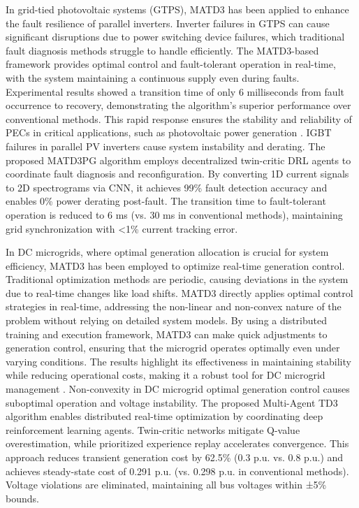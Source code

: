 In grid-tied photovoltaic systems (GTPS), MATD3 has been applied to enhance the fault resilience of parallel inverters. Inverter failures in GTPS can cause significant disruptions due to power switching device failures, which traditional fault diagnosis methods struggle to handle efficiently. The MATD3-based framework provides optimal control and fault-tolerant operation in real-time, with the system maintaining a continuous supply even during faults. Experimental results showed a transition time of only 6 milliseconds from fault occurrence to recovery, demonstrating the algorithm’s superior performance over conventional methods. This rapid response ensures the stability and reliability of PECs in critical applications, such as photovoltaic power generation \cite{malik2024fault}. IGBT failures in parallel PV inverters cause system instability and derating. The proposed MATD3PG algorithm employs decentralized twin-critic DRL agents to coordinate fault diagnosis and reconfiguration. By converting 1D current signals to 2D spectrograms via CNN, it achieves 99\% fault detection accuracy and enables 0\% power derating post-fault. The transition time to fault-tolerant operation is reduced to 6 ms (vs. 30 ms in conventional methods), maintaining grid synchronization with <1\% current tracking error.

In DC microgrids, where optimal generation allocation is crucial for system efficiency, MATD3 has been employed to optimize real-time generation control. Traditional optimization methods are periodic, causing deviations in the system due to real-time changes like load shifts. MATD3 directly applies optimal control strategies in real-time, addressing the non-linear and non-convex nature of the problem without relying on detailed system models. By using a distributed training and execution framework, MATD3 can make quick adjustments to generation control, ensuring that the microgrid operates optimally even under varying conditions. The results highlight its effectiveness in maintaining stability while reducing operational costs, making it a robust tool for DC microgrid management \cite{fan2023multi}. Non-convexity in DC microgrid optimal generation control causes suboptimal operation and voltage instability. The proposed Multi-Agent TD3 algorithm enables distributed real-time optimization by coordinating deep reinforcement learning agents. Twin-critic networks mitigate Q-value overestimation, while prioritized experience replay accelerates convergence. This approach reduces transient generation cost by 62.5\% (0.3 p.u. vs. 0.8 p.u.) and achieves steady-state cost of 0.291 p.u. (vs. 0.298 p.u. in conventional methods). Voltage violations are eliminated, maintaining all bus voltages within ±5\% bounds.

